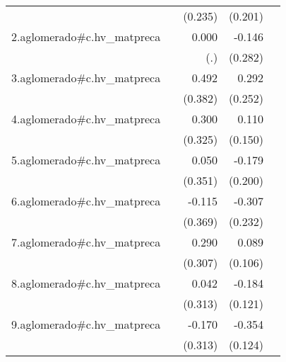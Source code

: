 {\begin{longtable}{l*{4}{D{.}{.}{-1}}}
            &                     &     (0.235)         &     (0.201)         &                     \\
\addlinespace
2.aglomerado#c.hv\_matpreca&                     &       0.000         &      -0.146         &                     \\
            &                     &         (.)         &     (0.282)         &                     \\
\addlinespace
3.aglomerado#c.hv\_matpreca&                     &       0.492         &       0.292         &                     \\
            &                     &     (0.382)         &     (0.252)         &                     \\
\addlinespace
4.aglomerado#c.hv\_matpreca&                     &       0.300         &       0.110         &                     \\
            &                     &     (0.325)         &     (0.150)         &                     \\
\addlinespace
5.aglomerado#c.hv\_matpreca&                     &       0.050         &      -0.179         &                     \\
            &                     &     (0.351)         &     (0.200)         &                     \\
\addlinespace
6.aglomerado#c.hv\_matpreca&                     &      -0.115         &      -0.307         &                     \\
            &                     &     (0.369)         &     (0.232)         &                     \\
\addlinespace
7.aglomerado#c.hv\_matpreca&                     &       0.290         &       0.089         &                     \\
            &                     &     (0.307)         &     (0.106)         &                     \\
\addlinespace
8.aglomerado#c.hv\_matpreca&                     &       0.042         &      -0.184         &                     \\
            &                     &     (0.313)         &     (0.121)         &                     \\
\addlinespace
9.aglomerado#c.hv\_matpreca&                     &      -0.170         &      -0.354\sym{**} &                     \\
            &                     &     (0.313)         &     (0.124)         &                     \\

\end{longtable}}
